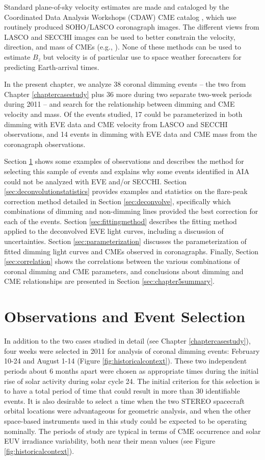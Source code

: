 Standard plane-of-sky velocity estimates are made and cataloged by the Coordinated Data Analysis Workshops (CDAW) CME catalog \citep{Gopalswamy2009}, which use routinely produced SOHO/LASCO coronagraph images. The different views from LASCO and SECCHI images can be used to better constrain the velocity, direction, and mass of CMEs (e.g., \citealt{Colaninno2009}). None of these methods can be used to estimate $B_z$ but velocity is of particular use to space weather forecasters for predicting Earth-arrival times.

In the present chapter, we analyze 38 coronal dimming events -- the two from Chapter \ref{chaptercasestudy} plus 36 more during two separate two-week periods during 2011 -- and search for the relationship between dimming and CME velocity and mass. Of the events studied, 17 could be parameterized in both dimming with EVE data and CME velocity from LASCO and SECCHI observations, and 14 events in dimming with EVE data and CME mass from the coronagraph observations. 

Section \ref{sec:eventselection} shows some examples of observations and describes the method for selecting this sample of events and explains why some events identified in AIA could not be analyzed with EVE and/or SECCHI. Section \ref{sec:deconvolutionstatistics} provides examples and statistics on the flare-peak correction method detailed in Section \ref{sec:deconvolve}, specifically which combinations of dimming and non-dimming lines provided the best correction for each of the events. Section \ref{sec:fittingmethod} describes the fitting method applied to the deconvolved EVE light curves, including a discussion of uncertainties. Section \ref{sec:parameterization} discusses the parameterization of fitted dimming light curves and CMEs observed in coronagraphs. Finally, Section \ref{sec:correlation} shows the correlations between the various combinations of coronal dimming and CME parameters, and conclusions about dimming and CME relationships are presented in Section \ref{sec:chapter5summary}.

\section{Observations and Event Selection}
\label{sec:eventselection}
In addition to the two cases studied in detail (see Chapter \ref{chaptercasestudy}), four weeks were selected in 2011 for analysis of coronal dimming events: February 10-24 and August 1-14 (Figure \ref{fig:historicalcontext}). These two independent periods about 6 months apart were chosen as appropriate times during the initial rise of solar activity during solar cycle 24. The initial criterion for this selection is to have a total period of time that could result in more than 30 identifiable events. It is also desirable to select a time when the two STEREO spacecraft orbital locations were advantageous for geometric analysis, and when the other space-based instruments used in this study could be expected to be operating nominally. The periods of study are typical in terms of CME occurrence and solar EUV irradiance variability, both near their mean values (see Figure \ref{fig:historicalcontext}).
 
